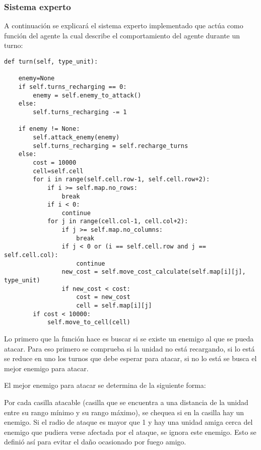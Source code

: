 \subsubsection{Sistema experto}

A continuaci\'on se explicar\'a el sistema experto implementado que act\'ua como funci\'on del agente la cual describe el comportamiento del agente durante un turno: 

	\lstset{language=Python,breaklines=true,basicstyle=\footnotesize,numbers=left}

\begin{lstlisting}	
def turn(self, type_unit):

    enemy=None
    if self.turns_recharging == 0:
        enemy = self.enemy_to_attack()
    else:
        self.turns_recharging -= 1

    if enemy != None:
        self.attack_enemy(enemy)
        self.turns_recharging = self.recharge_turns
    else:
        cost = 10000
        cell=self.cell
        for i in range(self.cell.row-1, self.cell.row+2):
            if i >= self.map.no_rows:
                break
            if i < 0:
                continue
            for j in range(cell.col-1, cell.col+2):
                if j >= self.map.no_columns:
                    break
                if j < 0 or (i == self.cell.row and j == self.cell.col):
                    continue
                new_cost = self.move_cost_calculate(self.map[i][j], type_unit)
                if new_cost < cost:
                    cost = new_cost
                    cell = self.map[i][j]
        if cost < 10000:
            self.move_to_cell(cell)
\end{lstlisting}

 Lo primero que la funci\'on hace es buscar si se existe un enemigo al que se pueda atacar. Para eso primero se comprueba si la unidad no est\'a recargando, si lo est\'a se reduce en uno los turnos que debe esperar para atacar, si no lo est\'a se busca el mejor enemigo para atacar. 
 
 El mejor enemigo para atacar se determina de la siguiente forma:
 
 Por cada casilla atacable (casilla que se encuentra a una distancia de la unidad entre su rango m\'inimo y su rango m\'aximo), se chequea si en la casilla hay un enemigo. Si el radio de ataque es mayor que 1 y hay una unidad amiga cerca del enemigo que pudiera verse afectada por el ataque, se ignora este enemigo. Esto se defini\'o as\'i para evitar el da\~{n}o ocasionado por fuego amigo.
 

